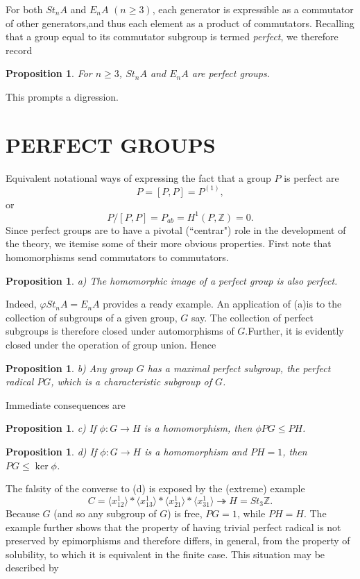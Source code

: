 \documentclass[openany,leqno]{book}  %
\newcommand{\Z}{\mathbb{Z}}
\newtheorem{prop}[theorem]{Proposition}
\begin{document}
For both $St_nA$ and $E_nA$ $(n\geqslant 3)$, each generator is expressible as a commutator of other generators,and thus each element as a product of commutators. Recalling that a group equal to its commutator subgroup is termed {\em perfect}, we therefore record
\begin{prop}
	For $n \geqslant 3$, $St_n A$ and $E_n A$ are perfect groups.
\end{prop}
This prompts a digression.
\section*{PERFECT GROUPS}
Equivalent notational ways of expressing the fact that a group $P$ is perfect are
\[P=[P,P]=P^{(1)},\]
or
\[P/[P,P]=P_{ab}=H^1(P,\Z)=0.\]
Since perfect groups are to have a pivotal (``centrar") role in the development of the theory, we itemise some of their more obvious properties. First note that homomorphisms send commutators to commutators.
\begin{prop}
a) The homomorphic image of a perfect group is also perfect.
\end{prop}
Indeed, $\varphi St_nA=E_nA$ provides a ready example. An application of (a)is to the collection of subgroups of a given group, $G$ say. The collection of perfect subgroups is therefore closed under automorphisms of $G$.Further, it is evidently closed under the operation of group union. Hence
\begin{prop}
b) Any group $G$ has a maximal perfect subgroup, the perfect radical $PG$, which is a characteristic subgroup of $G$.
\end{prop}
Immediate consequences are
\begin{prop}\label{1.4}
c) If $\phi\colon  G \rightarrow H$ is a homomorphism, then $\phi PG \leqslant PH$.
\end{prop}
\begin{prop}
d) If $\phi\colon  G \rightarrow H$ is a homomorphism and $ PH= 1$, then  $PG \leqslant \ker \phi$.
\end{prop}
The falsity of the converse to (d) is exposed by the (extreme) example
\[C=\langle x_{12}^1\rangle *\langle x_{13}^1\rangle *\langle x_{21}^1\rangle *\langle x_{31}^1\rangle \twoheadrightarrow H=St_3\Z.\]
Because $G$ (and so any subgroup of $G$) is free, $PG=1$, while $PH=H$. The example further shows that the property of having trivial perfect radical is not preserved by epimorphisms and therefore differs, in general, from the property of solubility, to which it is equivalent in the finite case. This situation may be described by
\end{document}
